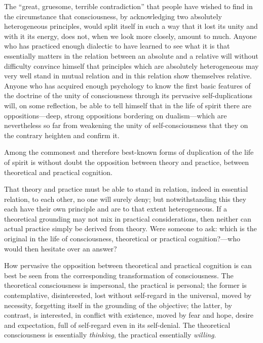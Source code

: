\documentclass[12pt,a4paper]{article}
\newcommand{\opage}[1]{\marginnote{\footnotesize\textit{[#1]}}}
\begin{document}
The ``great, gruesome, terrible contradiction'' that people have
wished to find in the circumstance that consciousness, by
acknowledging two absolutely heterogeneous principles, would split
itself in such a way that it lost its unity and with it its energy,
does not, when we look more closely, amount to much. Anyone who has
practiced enough dialectic to have learned to see what it is that
essentially matters in the relation between an absolute and a
relative will without difficulty convince himself that principles
which are absolutely heterogeneous may very well stand in mutual
relation and in this relation show themselves relative. Anyone who
has acquired enough
\opage{66}psychology to know the first basic features of the doctrine
of the unity of consciousness through its pervasive self-duplications
will, on some reflection, be able to tell himself that in the life of
spirit there are oppositions---deep, strong oppositions bordering on
dualism---which are nevertheless so far from weakening the unity of
self-consciousness that they on the contrary heighten and confirm it.

Among the commonest and therefore best-known forms of duplication of
the life of spirit is without doubt the opposition between theory and
practice, between theoretical and practical cognition.

That theory and practice must be able to stand in relation, indeed in
essential relation, to each other, no one will surely deny; but
notwithstanding this they each have their own principle and are to
that extent heterogeneous. If a theoretical grounding may not mix in
practical considerations, then neither can actual practice simply be
derived from theory. Were someone to ask: which is the original in the
life of consciousness, theoretical or practical cognition?---who would
then hesitate over an answer?

How pervasive the opposition between theoretical and practical
cognition is can best be seen from the corresponding transformation
of consciousness. The theoretical consciousness is impersonal, the
practical is personal; the former is contemplative, disinterested,
lost without self-regard in the universal, moved by necessity,
forgetting itself in the grounding of the objective; the latter, by
contrast, is interested, in conflict with existence, moved by fear
and hope, desire and expectation, full of self-regard even in its
self-denial. The theoretical consciousness is essentially
\emph{thinking}, the practical essentially \emph{willing}.
\end{document}
